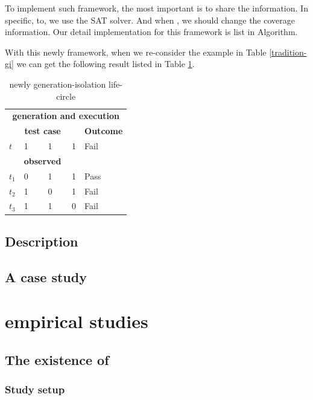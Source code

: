 \documentclass{sig-alternate}
\begin{document}
To implement such framework, the most important is to share the information. In specific, to, we use the SAT solver. And when , we should change the coverage information. Our detail implementation for this framework is list in Algorithm.

With this newly framework, when we re-consider the example in Table \ref{tradition-gi} we can get the following result listed in Table \ref{new-gi}.
\begin{table}[h]
\caption{newly generation-isolation life-circle}
\label{new-gi}
\center
\begin{tabular}{llllll}
\multicolumn{6}{c}{\bfseries generation and execution} \\
\multicolumn{5}{c}{\bfseries test case} & \bfseries Outcome \\
 $t$ & \multicolumn{4}{l}{1 \ \ \ \ 1 \ \ \ \  1 } & Fail \\
 \hline
\multicolumn{5}{c}{\bfseries observed} &  \\
$t_{1}$ &\multicolumn{4}{l}{0  \ \ \ \  1 \ \ \ \  1 }& Pass \\
$t_{2}$ &\multicolumn{4}{l}{1  \ \ \ \  0 \ \ \ \  1 } & Fail \\
$t_{3}$ &\multicolumn{4}{l}{1  \ \ \ \  1 \ \ \ \  0 } & Fail \\
\end{tabular}
\end{table}

\subsection{Description}


\subsection{A case study}

\section{empirical studies}


\subsection{The existence of }


\subsubsection{Study setup}
\end{document}
